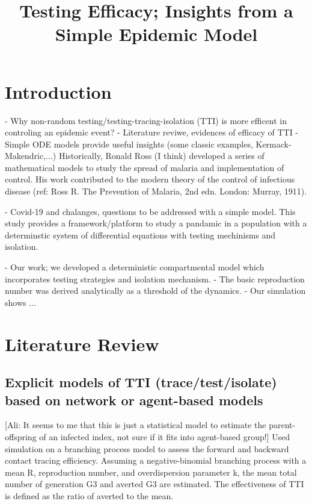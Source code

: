 \documentclass{article}
\title{Testing Efficacy; Insights from a Simple Epidemic Model }
\begin{document}
\maketitle

\section{Introduction}

- Why non-random testing/testing-tracing-isolation (TTI) is more efficent in controling an epidemic event?
- Literature reviwe, evidences of efficacy of TTI
- Simple ODE models provide useful insights (some classic examples, Kermack-Makendric,...)
Historically, Ronald Ross (I think) developed a series of mathematical models to study the spread of malaria and implementation of control. His work contributed to the modern theory of the control of
infectious disease (ref: Ross R. The Prevention of Malaria, 2nd edn. London: Murray, 1911).


- Covid-19 and chalanges, questions to be addressed with a simple model.
This study provides a framework/platform to study a pandamic in a population with a determinstic system of differential equations with testing mechinisms and isolation. 

- Our work; we developed a deterministic compartmental model which incorporates testing strategies and isolation mechanism. 
- The basic reproduction number was derived analytically as a threshold of the dynamics. 
- Our simulation shows ...

\section{Literature Review}

\subsection{Explicit models of TTI (trace/test/isolate) based on network or agent-based models}
\citep{endo2020implication} [Ali: It seems to me that this is just a statistical model to estimate the parent-offspring of an infected index, not sure if it fits into agent-based group!] Used simulation on a branching process model to assess the forward and backward contact tracing efficiency. Assuming a negative-binomial branching process with a mean R, reproduction number, and overdispersion parameter k, the mean total number of generation G3 and averted G3 are estimated. The effectiveness of TTI is defined as the ratio of averted to the mean.
\end{document}
